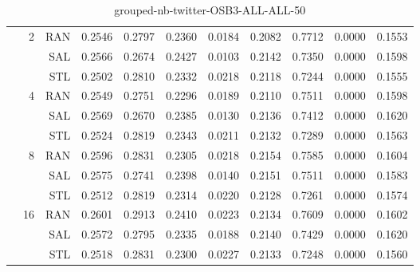 \begin{center}
\begin{table}[htbp]
\begin{center}
\begin{tabular}{ | r | r | r | r | r | r | r | r | r | r | r |}
 & \multirow{3}{*}{2} & RAN & 0.2546 & 0.2797 & 0.2360 & 0.0184 & 0.2082 & 0.7712 & 0.0000 & 0.1553\\ \cline{3-11}
 &   & SAL & 0.2566 & 0.2674 & 0.2427 & 0.0103 & 0.2142 & 0.7350 & 0.0000 & 0.1598\\ \cline{3-11}
 &   & STL & 0.2502 & 0.2810 & 0.2332 & 0.0218 & 0.2118 & 0.7244 & 0.0000 & 0.1555\\ \cline{2-11}
 & \multirow{3}{*}{4} & RAN & 0.2549 & 0.2751 & 0.2296 & 0.0189 & 0.2110 & 0.7511 & 0.0000 & 0.1598\\ \cline{3-11}
 &   & SAL & 0.2569 & 0.2670 & 0.2385 & 0.0130 & 0.2136 & 0.7412 & 0.0000 & 0.1620\\ \cline{3-11}
 &   & STL & 0.2524 & 0.2819 & 0.2343 & 0.0211 & 0.2132 & 0.7289 & 0.0000 & 0.1563\\ \cline{2-11}
 & \multirow{3}{*}{8} & RAN & 0.2596 & 0.2831 & 0.2305 & 0.0218 & 0.2154 & 0.7585 & 0.0000 & 0.1604\\ \cline{3-11}
 &   & SAL & 0.2575 & 0.2741 & 0.2398 & 0.0140 & 0.2151 & 0.7511 & 0.0000 & 0.1583\\ \cline{3-11}
 &   & STL & 0.2512 & 0.2819 & 0.2314 & 0.0220 & 0.2128 & 0.7261 & 0.0000 & 0.1574\\ \cline{2-11}
 & \multirow{3}{*}{16} & RAN & 0.2601 & 0.2913 & 0.2410 & 0.0223 & 0.2134 & 0.7609 & 0.0000 & 0.1602\\ \cline{3-11}
 &   & SAL & 0.2572 & 0.2795 & 0.2335 & 0.0188 & 0.2140 & 0.7429 & 0.0000 & 0.1620\\ \cline{3-11}
 &   & STL & 0.2518 & 0.2831 & 0.2300 & 0.0227 & 0.2133 & 0.7248 & 0.0000 & 0.1560\\ \cline{2-11}
\hline
\end{tabular}
\caption{grouped-nb-twitter-OSB3-ALL-ALL-50}
\end{center}
 \end{table}
\end{center}

